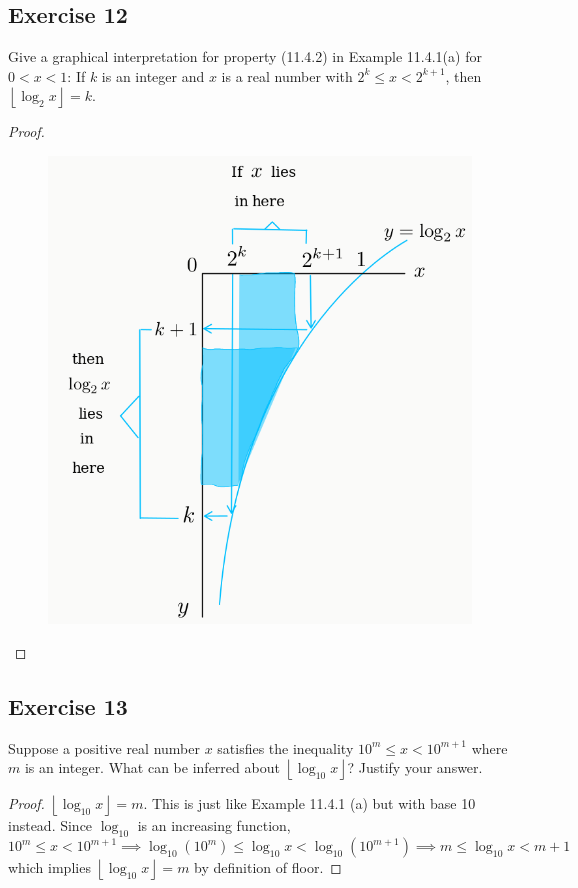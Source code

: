 \documentclass[14pt]{extarticle}
\newcommand{\floor}[1]{{\left\lfloor#1\right\rfloor}}
\begin{document}
\subsection{Exercise 12}
Give a graphical interpretation for property (11.4.2) in Example 11.4.1(a) for \(0 < x < 1\): If \(k\) is an integer
and \(x\) is a real number with \(2^k \leq x < 2^{k + 1}\), then \(\floor{\log_2 x} = k\).

\begin{proof}
    \begin{figure}[ht!]
        \centering
        \includegraphics[scale=0.4]{../images/11.4.12.png}
    \end{figure}
\end{proof}

\subsection{Exercise 13}
Suppose a positive real number \(x\) satisfies the inequality \(10^m \leq x < 10^{m+1}\) where \(m\) is an integer. What can
be inferred about \(\floor{\log_{10} x}\)? Justify your answer.

\begin{proof}
    \(\floor{\log_{10} x} = m\). This is just like Example 11.4.1 (a) but with base 10 instead. Since \(\log_{10}\) is an
    increasing function,
    \[
        10^m \leq x < 10^{m+1} \implies \log_{10}(10^m) \leq \log_{10}x < \log_{10}(10^{m+1}) \implies m \leq \log_{10}x < m+1
    \]
    which implies \(\floor{\log_{10} x} = m\) by definition of floor.
\end{proof}
\end{document}
